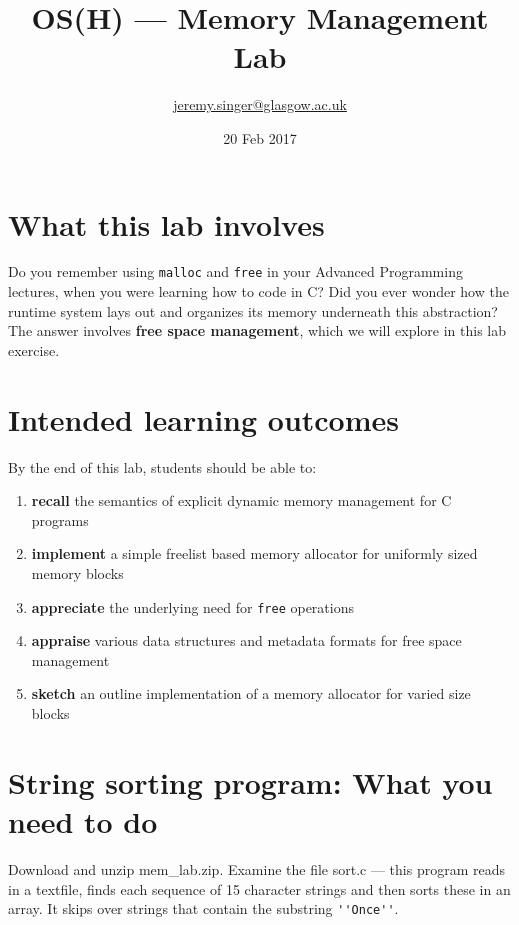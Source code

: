 \documentclass{article}
\begin{document}
\title{OS(H) --- Memory Management Lab}
\author{\url{jeremy.singer@glasgow.ac.uk}}
\date{20 Feb 2017}

\maketitle

\section{What this lab involves}

Do you remember using \lstinline|malloc| and \lstinline|free|
in your Advanced Programming lectures, when you were learning
how to code in C? Did you ever wonder how the runtime system
lays out and organizes its memory underneath this abstraction?
The answer involves \textbf{free space management}, which we will
explore in this lab exercise.

\section{Intended learning outcomes}

By the end of this lab, students should be able to:
\begin{enumerate}
\item \textbf{recall} the semantics of explicit dynamic memory management for C programs
\item \textbf{implement} a simple freelist based memory allocator for uniformly sized memory blocks
\item \textbf{appreciate} the underlying need for \lstinline|free| operations
\item \textbf{appraise} various data structures and metadata formats for free space management
\item \textbf{sketch} an outline implementation of a memory allocator for varied size blocks
\end{enumerate}

\section{String sorting program: What you need to do}

Download and unzip mem\_{}lab.zip. Examine the file sort.c ---
this program reads in a textfile, finds each sequence of 15 character
strings and then sorts these in an array. It skips over strings
that contain the substring \lstinline|''Once''|.
\end{document}

